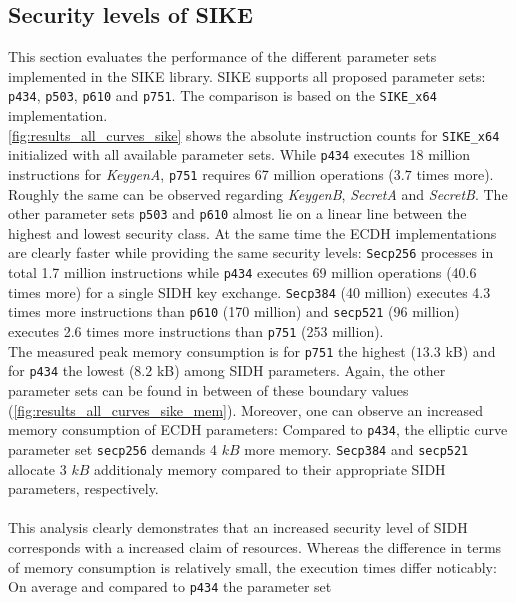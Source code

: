 \subsection{Security levels of SIKE}\label{sec:levels_sike}
This section evaluates the performance of the different parameter sets implemented in the \gls{SIKE} library.  \gls{SIKE} supports all proposed parameter sets: \texttt{p434}, \texttt{p503}, \texttt{p610} and \texttt{p751}. The comparison is based on the \texttt{SIKE\_x64} implementation.\\
\autoref{fig:results_all_curves_sike} shows the absolute instruction counts for \texttt{SIKE\_x64} initialized with all available parameter sets. While \texttt{p434} executes 18 million instructions for \textit{KeygenA}, \texttt{p751} requires 67 million operations ($3.7$ times more). Roughly the same can be observed regarding \textit{KeygenB}, \textit{SecretA} and \textit{SecretB}. The other parameter sets \texttt{p503} and \texttt{p610} almost lie on a linear line between the highest and lowest security class. At the same time the \gls{ECDH} implementations are clearly faster while providing the same security levels: \texttt{Secp256} processes in total 1.7 million instructions while \texttt{p434} executes 69 million operations (40.6 times more) for a single \gls{SIDH} key exchange. \texttt{Secp384} (40 million) executes 4.3 times more instructions than \texttt{p610} (170 million) and \texttt{secp521} (96 million) executes 2.6 times more instructions than \texttt{p751} (253 million).\\
The measured peak memory consumption is for \texttt{p751} the highest ($13.3$ \gls{kB}) and for \texttt{p434} the lowest ($8.2$ \gls{kB}) among \gls{SIDH} parameters. Again, the other parameter sets can be found in between of these boundary values (\autoref{fig:results_all_curves_sike_mem}). Moreover, one can observe an increased memory consumption of \gls{ECDH} parameters: Compared to \texttt{p434}, the elliptic curve parameter set \texttt{secp256} demands 4 $kB$ more memory. \texttt{Secp384} and \texttt{secp521} allocate 3 $kB$ additionaly memory compared to their appropriate \gls{SIDH} parameters, respectively.\\\\
This analysis clearly demonstrates that an increased security level of \gls{SIDH} corresponds with a increased claim of resources. Whereas the difference in terms of memory consumption is relatively small, the execution times differ noticably: On average and compared to \texttt{p434} the parameter set
